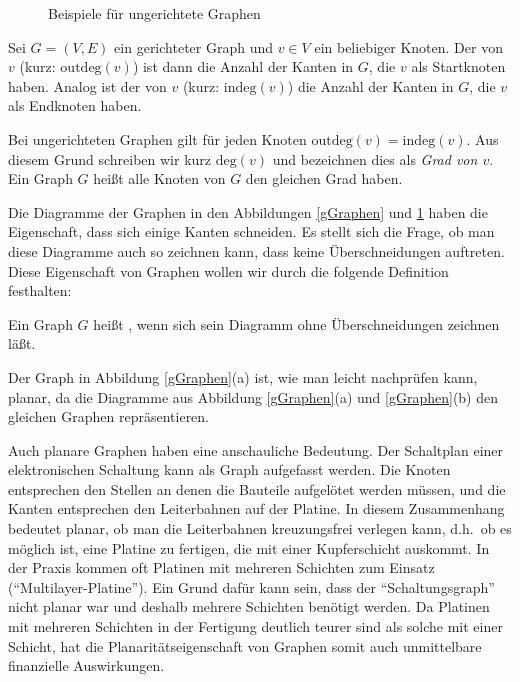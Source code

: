 \begin{figure}
\centering
{}
\hfill
{}
\hfill
{}
\caption{Beispiele für ungerichtete Graphen}
\label{ugGraphen}
\end{figure}

\begin{definition}
Sei $G = (V,E)$ ein gerichteter Graph und $v \in V$ ein beliebiger
Knoten. Der  von $v$ (kurz:
$\mathrm{outdeg}(v)$) ist dann 
die Anzahl der Kanten in $G$, die $v$ als Startknoten haben. Analog 
ist der  von $v$ 
(kurz: $\mathrm{indeg}(v)$) die 
Anzahl der Kanten in $G$, die $v$ als Endknoten haben.

Bei ungerichteten Graphen gilt für jeden Knoten
$\mathrm{outdeg}(v)=\mathrm{indeg}(v)$. Aus diesem Grund schreiben wir
kurz $\mathrm{deg}(v)$ und bezeichnen dies als \emph{Grad von
$v$}. 
Ein Graph $G$ heißt  \gdw alle
Knoten von $G$ den gleichen Grad haben.
\end{definition}
Die Diagramme der Graphen in den Abbildungen \ref{gGraphen}
und \ref{ugGraphen} haben die Eigenschaft, dass sich einige Kanten
schneiden. Es stellt sich die Frage, ob man diese Diagramme auch so
zeichnen kann, dass keine Überschneidungen auftreten. Diese
Eigenschaft von Graphen wollen wir durch die folgende Definition
festhalten:
\begin{definition}
Ein Graph $G$ heißt , wenn sich sein Diagramm ohne
Überschneidungen zeichnen läßt.
\end{definition}

\begin{example}
Der Graph in Abbildung \ref{gGraphen}(a) ist, wie man leicht
nachprüfen kann, planar, da die Diagramme aus
Abbildung \ref{gGraphen}(a) und \ref{gGraphen}(b) den gleichen Graphen
repräsentieren.
\end{example}
Auch planare Graphen haben eine anschauliche Bedeutung. Der Schaltplan
einer elektronischen Schaltung kann als Graph aufgefasst werden. Die
Knoten entsprechen den Stellen an denen die Bauteile aufgelötet werden
müssen, und die Kanten entsprechen den Leiterbahnen auf der
Platine. In diesem Zusammenhang bedeutet planar, ob man die
Leiterbahnen kreuzungsfrei verlegen kann, d.h.~ob es möglich ist, eine
Platine zu fertigen, die mit einer Kupferschicht auskommt. In der
Praxis kommen oft Platinen mit mehreren Schichten zum Einsatz
("`Multilayer-Platine"'). Ein Grund dafür kann sein, dass der
"`Schaltungsgraph"' nicht planar war und deshalb mehrere Schichten
benötigt werden. Da Platinen mit mehreren Schichten in der Fertigung
deutlich teurer sind als solche mit einer Schicht, hat die
Planaritätseigenschaft von Graphen somit auch unmittelbare finanzielle
Auswirkungen.

